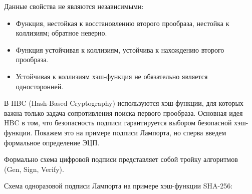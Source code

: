 \documentclass[a4paper, 14pt]{extarticle}
\begin{document}
Данные свойства не являются независимыми:

\begin{itemize}
    \item Функция, нестойкая к восстановлению второго прообраза, нестойка к коллизиям; обратное неверно.
    \item Функция устойчивая к коллизиям, устойчива к нахождению второго прообраза.
    \item Устойчивая к коллизиям хэш-функция не обязательно является односторонней.
\end{itemize}

В HBC (Hash-Based Cryptography) используются хэш-функции, для которых важна только задача сопротивления поиска первого прообраза. Основная идея HBC в том, что безопасность подписи гарантируется выбором безопасной хэш-функции. Покажем это на примере подписи Лампорта, но сперва введем формальное определение ЭЦП.

Формально схема цифровой подписи представляет собой тройку алгоритмов (Gen, Sign, Verify).

Схема одноразовой подписи Лампорта на примере хэш-функции SHA-256:
\end{document}
